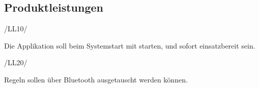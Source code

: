 \subsection{Produktleistungen}
\begin{minipage}{3cm}
/LL10/
\end{minipage}
\begin{minipage}{13cm}
Die Applikation soll beim Systemstart mit starten, und sofort einsatzbereit sein.\\
\end{minipage}
\begin{minipage}{3cm}
/LL20/
\end{minipage}
\begin{minipage}{13cm}
Regeln sollen \"uber Bluetooth ausgetauscht werden k\"onnen.\\
\end{minipage}